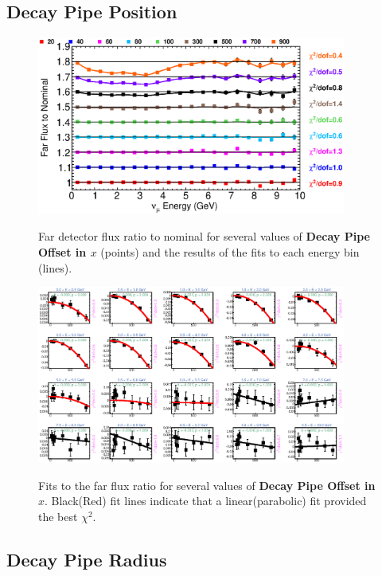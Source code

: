 \clearpage
\subsection{Decay Pipe Position}

\begin{figure}[ht]
  \begin{center}
    {\includegraphics[width=4.0in]{figures/DecayPipeOffsetX_far_summary.eps}}
  \end{center}
\caption{ Far detector flux ratio to nominal for several values of {\bf Decay Pipe Offset in $x$} (points) and the results of the fits to each energy bin (lines).}
\end{figure}

\begin{figure}[hb]
  \begin{center}
    {\includegraphics[width=4.0in]{figures/DecayPipeOffsetX_far_fits.eps}}
  \end{center}
\caption{ Fits to the far flux ratio for several values of {\bf Decay Pipe Offset in $x$}. Black(Red) fit lines indicate that a linear(parabolic) fit provided the best $\chi^2$. }
\end{figure}

\clearpage
\subsection{Decay Pipe Radius}

